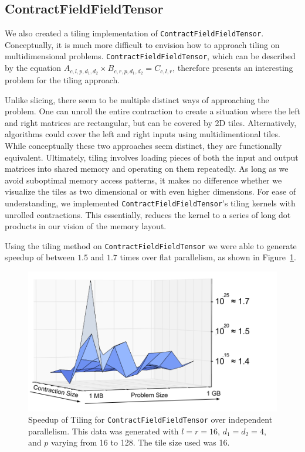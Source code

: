 \subsection{ContractFieldFieldTensor}

We also created a tiling implementation of \texttt{ContractFieldFieldTensor}. Conceptually, it is much more difficult to envision how to approach tiling on multidimensional problems. \texttt{ContractFieldFieldTensor}, which can be described by the equation $A_{c,l,p,d_1,d_2} \times B_{c, r, p,d_1,d_2} = C_{c,l, r}$, therefore presents an interesting problem for the tiling approach. 

Unlike slicing, there seem to be multiple distinct ways of approaching the
problem. One can unroll the entire contraction to create a situation where
the left and right matrices are rectangular, but can be covered by 2D tiles.
Alternatively, algorithms could cover the left and right inputs using
multidimentional tiles. While conceptually these two approaches seem distinct,
they are functionally equivalent. Ultimately, tiling involves loading pieces of
both the input and output matrices into shared memory and operating on them
repeatedly. As long as we avoid suboptimal memory access patterns, it makes no
difference whether we visualize the tiles as two dimensional or with even higher
dimensions. For ease of understanding, we implemented
\texttt{ContractFieldFieldTensor}'s tiling kernels with unrolled
contractions. This essentially, reduces the kernel to a series of long dot
products in our vision of the memory layout. 

Using the tiling method on \texttt{ContractFieldFieldTensor} we were able to generate speedup of between $1.5$ and $1.7$ times over flat parallelism, as shown in Figure~\ref{fig:CFFTSpeedup}. 

\begin{figure}[H]
    \centering
\includegraphics[width=5in]{ContractFieldFieldTensor}
\caption[\texttt{ContractFieldFieldScalar} Tiling performance]{Speedup of Tiling
    for \texttt{ContractFieldFieldTensor} over independent parallelism. This data was
    generated with $l = r = 16$, $d_1 =
d_2 = 4$, and $p$ varying from 16 to 128. The tile size used was 16.}
\label{fig:CFFTSpeedup}
\end{figure}

